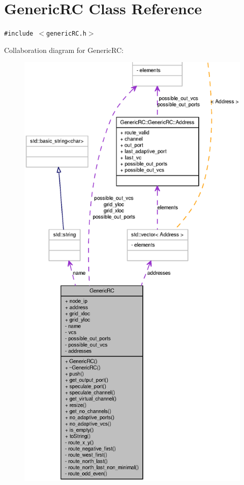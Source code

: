\section{GenericRC Class Reference}
\label{classGenericRC}
{\tt \#include $<$genericRC.h$>$}

Collaboration diagram for GenericRC:\nopagebreak
\begin{figure}[H]
\begin{center}
\leavevmode
\includegraphics[width=400pt]{classGenericRC__coll__graph}
\end{center}
\end{figure}
